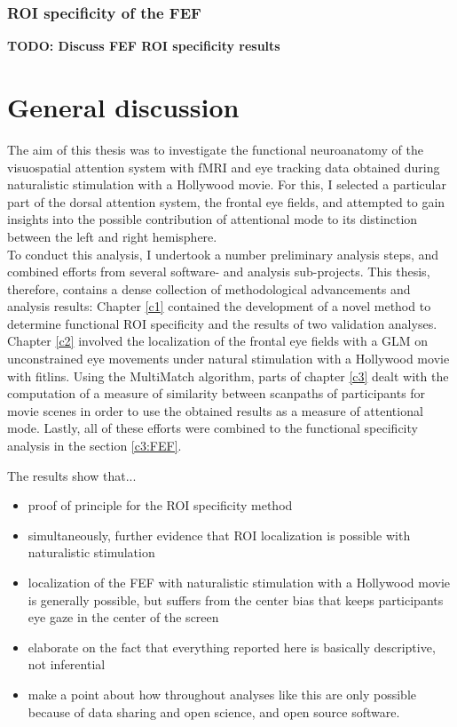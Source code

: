 \documentclass[a4paper, 12pt]{scrreprt}
\begin{document}
\subsection{ROI specificity of the FEF}
\textbf{TODO: Discuss FEF ROI specificity results}

\chapter{General discussion}\label{section:discussion}
The aim of this thesis was to investigate the functional neuroanatomy of the visuospatial attention system with fMRI and eye tracking data obtained during naturalistic stimulation with a Hollywood movie. For this, I selected a particular part of the dorsal attention system, the frontal eye fields, and attempted to gain insights into the possible contribution of attentional mode to its distinction between the left and right hemisphere. \\
To conduct this analysis, I undertook a number preliminary analysis steps, and combined efforts from several software- and analysis sub-projects. This thesis, therefore, contains a dense collection of methodological advancements and analysis results: Chapter \ref{c1} contained the development of a novel method to determine functional ROI specificity and the results of two validation analyses. Chapter \ref{c2} involved the localization of the frontal eye fields with a GLM on unconstrained eye movements under natural stimulation with a Hollywood movie with fitlins. Using the MultiMatch algorithm, parts of chapter \ref{c3} dealt with the computation of a measure of similarity between scanpaths of participants for movie scenes in order to use the obtained results as a measure of attentional mode. Lastly, all of these efforts were combined to the functional specificity analysis in the section \ref{c3:FEF}. \\

\bigskip

 The results show that...
 \begin{itemize}
 	\item{proof of principle for the ROI specificity method}
 	\item{simultaneously, further evidence that ROI localization is possible with naturalistic stimulation}
 	\item{localization of the FEF with naturalistic stimulation with a Hollywood movie is generally possible, but suffers from the center bias that keeps participants eye gaze in the center of the screen }
 	\item elaborate on the fact that everything reported here is basically descriptive, not inferential
 	\item make a point about how throughout analyses like this are only possible because of data sharing and open science, and open source software.
 \end{itemize}
 
\end{document}
